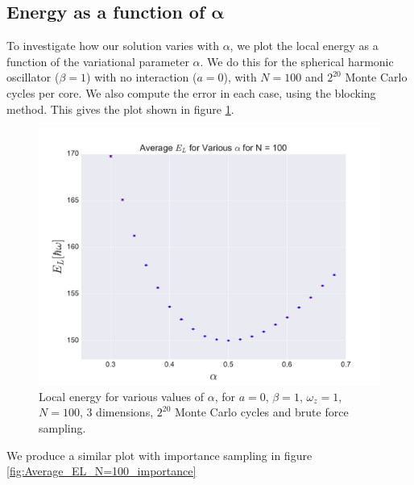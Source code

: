 \documentclass[a4paper, 10pt]{article}
\begin{document}
	\subsection{Energy as a function of $\boldsymbol{\alpha}$}
	To investigate how our solution varies with $\alpha$, we plot the local energy as a function of the variational parameter $\alpha$. We do this for the spherical harmonic oscillator ($\beta=1$) with no interaction ($a=0$), with $N=100$ and $2^{20}$ Monte Carlo cycles per core. We also compute the error in each case, using the blocking method. This gives the plot shown in figure \ref{fig:Average_EL_N=100_brute_force}.
	\begin{figure}[ht!]
		\centering
		\includegraphics[scale=0.8]{../Results/N100ax20/EvAlphaN100.pdf}
		\caption{Local energy for various values of $\alpha$, for $a=0$, $\beta=1$, $\omega_z=1$, $N=100$, 3 dimensions, $2^{20}$ Monte Carlo cycles and brute force sampling.}\label{fig:Average_EL_N=100_brute_force}
	\end{figure}	
	We produce a similar plot with importance sampling in figure \ref{fig:Average_EL_N=100_importance} 
\end{document}

